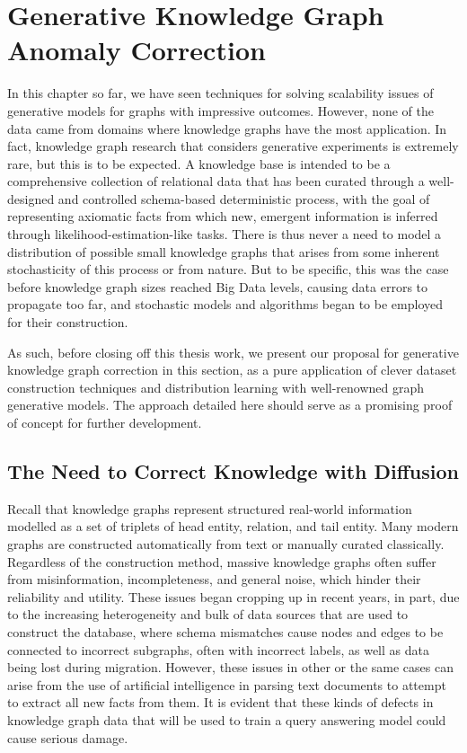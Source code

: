 \section{Generative Knowledge Graph Anomaly Correction}
\label{sec: kg_generation}

In this chapter so far, we have seen techniques for solving scalability issues of generative models for graphs with impressive outcomes. However, none of the data came from domains where knowledge graphs have the most application. In fact, knowledge graph research that considers generative experiments is extremely rare, but this is to be expected. A knowledge base is intended to be a comprehensive collection of relational data that has been curated through a well-designed and controlled schema-based deterministic process, with the goal of representing axiomatic facts from which new, emergent information is inferred through likelihood-estimation-like tasks. There is thus never a need to model a distribution of possible small knowledge graphs that arises from some inherent stochasticity of this process or from nature. But to be specific, this was the case before knowledge graph sizes reached Big Data levels, causing data errors to propagate too far, and stochastic models and algorithms began to be employed for their construction. 

As such, before closing off this thesis work, we present our proposal for generative knowledge graph correction in this section, as a pure application of clever dataset construction techniques and distribution learning with well-renowned graph generative models. The approach detailed here should serve as a promising proof of concept for further development. 

\subsection{The Need to Correct Knowledge with Diffusion}

Recall that knowledge graphs represent structured real-world information modelled as a set of triplets
of head entity, relation, and tail entity. Many modern graphs are constructed automatically from
text or manually curated classically. Regardless of the construction method, massive knowledge graphs often suffer from misinformation, incompleteness, and general noise, which hinder their reliability and utility. These issues began cropping up in recent years, in part, due to the increasing heterogeneity and bulk of data sources that are used to construct the database, where schema mismatches cause nodes and edges to be connected to incorrect subgraphs, often with incorrect labels, as well as data being lost during migration. However, these issues in other or the same cases can arise from the use of artificial intelligence in parsing text documents to attempt to extract all new facts from them. It is evident that these kinds of defects in knowledge graph data that will be used to train a query answering model could cause serious damage.

